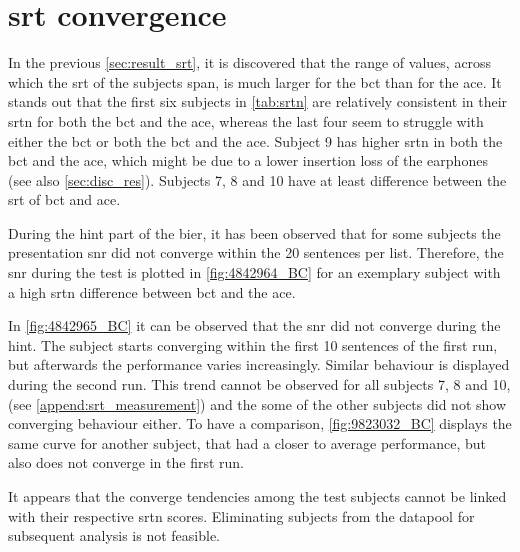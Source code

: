 \section{\gls{srt} convergence}
In the previous \autoref{sec:result_srt}, it is discovered that the range of values, across which the \gls{srt} of the subjects span, is much larger for the \gls{bct} than for the \gls{ace}. 
It stands out that the first six subjects in \autoref{tab:srtn} are relatively consistent in their \gls{srtn} for both the \gls{bct} and the \gls{ace}, whereas the last four seem to struggle with either the \gls{bct} or both the \gls{bct} and the \gls{ace}. Subject 9 has higher \gls{srtn} in both the \gls{bct} and the \gls{ace}, which might be due to a lower insertion loss of the earphones (see also \autoref{sec:disc_res}). Subjects 7, 8 and 10 have at least  difference between the \gls{srt} of \gls{bct} and \gls{ace}. 


During the \gls{hint} part of the \gls{bier}, it has been observed that for some subjects the presentation \gls{snr} did not converge within the 20 sentences per list. 
Therefore, the \gls{snr} during the test is plotted in \autoref{fig:4842964_BC} for an exemplary subject with a high \gls{srtn} difference between \gls{bct} and the \gls{ace}. 



In \autoref{fig:4842965_BC} it can be observed that the \gls{snr} did not converge during the \gls{hint}. The subject starts converging within the first 10 sentences of the first run, but afterwards the performance varies increasingly. Similar behaviour is displayed during the second run.
This trend cannot be observed for all subjects 7, 8 and 10, (see \autoref{append:srt_measurement}) and the some of the other subjects did not show converging behaviour either. 
To have a comparison, \autoref{fig:9823032_BC} displays the same curve for another subject, that had a closer to average performance, but also does not converge in the first run.

It appears that the converge tendencies among the test subjects cannot be linked with their respective \gls{srtn} scores. Eliminating subjects from the datapool for subsequent analysis is not feasible.
